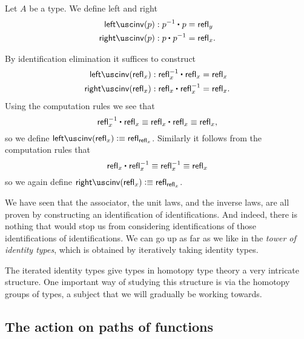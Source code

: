 \begin{defn}\label{defn:id_invlaw}
Let $A$ be a type. We define left and right 
\begin{align*}
\leftinv(p) & : \ct{p^{-1}}{p} = \refl{y} \\
\rightinv(p) & : \ct{p}{p^{-1}} = \refl{x}.
\end{align*}
\end{defn}

\begin{constr}
By identification elimination it suffices to construct
\begin{align*}
\leftinv(\refl{x}) & : \ct{\refl{x}^{-1}}{\refl{x}} = \refl{x} \\
\rightinv(\refl{x}) & : \ct{\refl{x}}{\refl{x}^{-1}} = \refl{x}.
\end{align*}
Using the computation rules we see that
\begin{equation*}
\ct{\refl{x}^{-1}}{\refl{x}}\jdeq \ct{\refl{x}}{\refl{x}}\jdeq\refl{x},
\end{equation*}
so we define $\leftinv(\refl{x})\defeq \refl{\refl{x}}$. Similarly it follows from the computation rules that
\begin{equation*}
\ct{\refl{x}}{\refl{x}^{-1}} \jdeq \refl{x}^{-1}\jdeq \refl{x}
\end{equation*}
so we again define $\rightinv(\refl{x})\defeq\refl{\refl{x}}$. 
\end{constr}

\begin{rmk}
  We have seen that the associator, the unit laws, and the inverse laws, are all proven by constructing an identification of identifications. And indeed, there is nothing that would stop us from considering identifications of those identifications of identifications. We can go up as far as we like in the \emph{tower of identity types}, which is obtained by iteratively taking identity types.

  The iterated identity types give types in homotopy type theory a very intricate structure. One important way of studying this structure is via the homotopy groups of types, a subject that we will gradually be working towards.
\end{rmk}

\subsection{The action on paths of functions}

